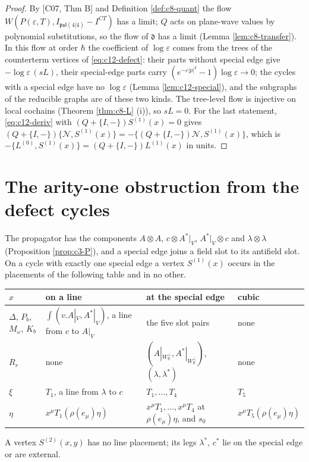 \begin{proof}
By [C07, Thm B] and Definition \ref{def:c8-quant} the flow $W(P(\varepsilon,T),I_{\mathfrak{psl}(4|4)}-I^{CT})$ has a limit; $Q$ acts on plane-wave values by polynomial substitutions, so the flow of $\mathfrak d$ has a limit (Lemma \ref{lem:c8-transfer}). In this flow at order $\hbar$ the coefficient of $\log\varepsilon$ comes from the trees of the counterterm vertices of \eqref{eq:c12-defect}: their parts without special edge give $-\log\varepsilon\,(sL)$, their special-edge parts carry $(e^{-\varepsilon|p|^2}-1)\log\varepsilon\to0$; the cycles with a special edge have no $\log\varepsilon$ (Lemma \ref{lem:c12-special}), and the subgraphs of the reducible graphs are of these two kinds. The tree-level flow is injective on local cochains (Theorem \ref{thm:c8-L} (i)), so $sL=0$. For the last statement, \eqref{eq:c12-deriv} with $(Q+\{I,-\})S^{(1)}(x)=0$ gives $(Q+\{I,-\})\{\mathcal N,S^{(1)}(x)\}=-\{(Q+\{I,-\})\mathcal N,S^{(1)}(x)\}$, which is $-\{L^{(0)},S^{(1)}(x)\}=(Q+\{I,-\})L^{(1)}(x)$ in units.
\end{proof}

\section{The arity-one obstruction from the defect cycles}

\begin{lemma}
\label{lem:c12-place}
The propagator has the components $A\otimes A$, $c\otimes A^*|_V$, $A^*|_V\otimes c$ and $\lambda\otimes\lambda$ (Proposition \ref{prop:c3-P}), and a special edge joins a field slot to its antifield slot. On a cycle with exactly one special edge a vertex $S^{(1)}(x)$ occurs in the placements of the following table and in no other.

\begin{tabular}{l|l|l|l}
$x$ & on a line & at the special edge & cubic\\
\hline
$\Delta$, $P_b$, $M_\omega$, $K_b$ & $\int(v.A|_V,A^*|_V)$, a line from $c$ to $A|_V$ & the five slot pairs & none\\
$R_r$ & none & $(A|_{W_{\mathbb R}^\perp},A^*|_{W_{\mathbb R}^\perp})$, $(\lambda,\lambda^*)$ & none\\
$\xi$ & $T_1$, a line from $\lambda$ to $c$ & $T_1,\dots,T_4$ & $T_5$\\
$\eta$ & $x^\mu T_1(\rho(e_\mu)\eta)$ & $x^\mu T_{1},\dots,x^\mu T_4$ at $\rho(e_\mu)\eta$, and $s_0$ & $x^\mu T_5(\rho(e_\mu)\eta)$\\
\end{tabular}

A vertex $S^{(2)}(x,y)$ has no line placement; its legs $\lambda^*$, $c^*$ lie on the special edge or are external.
\end{lemma}

